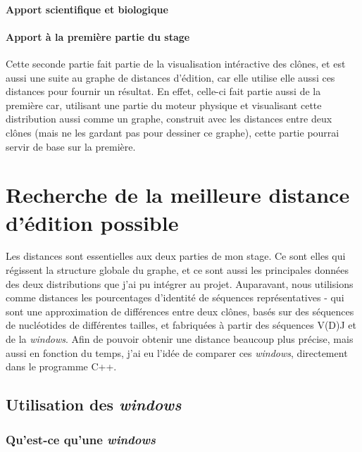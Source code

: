 \documentclass[12pt]{report}
\begin{document}
\begin{spacing}{1.2}
\subsubsection{Apport scientifique et biologique}

\subsubsection{Apport à la première partie du stage}

Cette seconde partie fait partie de la visualisation intéractive des clônes, et est aussi une suite au graphe de distances d'édition, car elle utilise elle aussi ces distances pour fournir un résultat.
\newline
En effet, celle-ci fait partie aussi de la première car, utilisant une partie du moteur physique et visualisant cette distribution aussi comme un graphe, construit avec les distances entre deux clônes (mais ne les gardant pas pour dessiner ce graphe), cette partie pourrai servir de base sur la première.

\chapter{Recherche de la meilleure distance d'édition possible}

Les distances sont essentielles aux deux parties de mon stage. Ce sont elles qui régissent la structure globale du graphe, et ce sont aussi les principales données des deux distributions que j'ai pu intégrer au projet.
\newline
Auparavant, nous utilisions comme distances les pourcentages d'identité de séquences représentatives - qui sont une approximation de différences entre deux clônes, basés sur des séquences de nucléotides de différentes tailles, et fabriquées à partir des séquences V(D)J et de la \textit{windows}.
\newline
Afin de pouvoir obtenir une distance beaucoup plus précise, mais aussi en fonction du temps, j'ai eu l'idée de comparer ces \textit{windows}, directement dans le programme C++.

\section{Utilisation des \textit{windows}}

\subsection{Qu'est-ce qu'une \textit{windows}}


\end{spacing}
\end{document}

